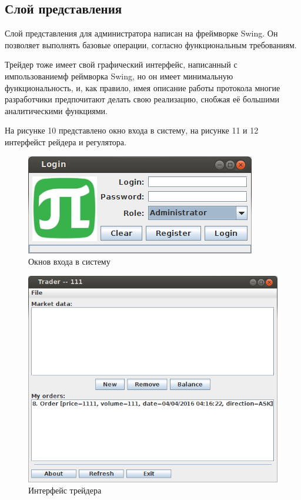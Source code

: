 \documentclass[a4paper, 12pt]{article}        %
\begin{document}
\subsection{Слой представления}

Слой представления для администратора написан на фреймворке Swing. Он позволяет выполнять базовые операции, согласно функциональным требованиям.

Трейдер тоже имеет свой графический интерфейс, написанный с импользованиемф реймворка Swing, но он имеет минимальную функциональность, и, как правило, имея описание работы протокола многие разработчики предпочитают делать свою реализацию, снобжая её большими аналитическими функциями.

На рисунке 10 представлено окно входа в систему, на рисунке 11 и 12 интерфейст рейдера и регулятора.

\begin{figure}[h!]
\centering
\includegraphics[scale=0.8]{res/pic10}
\caption{Окнов входа в систему}
\end{figure}

\begin{figure}[h!]
\centering
\includegraphics[scale=0.8]{res/pic11}
\caption{Интерфейс трейдера}
\end{figure}
\end{document}
